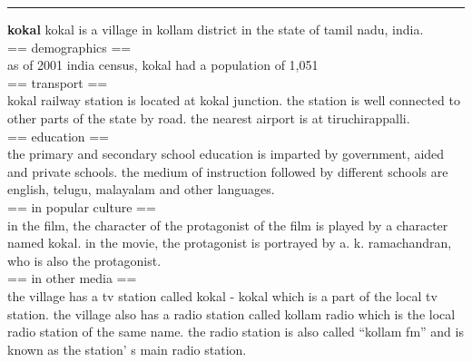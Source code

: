 \documentclass[11pt,a4paper]{article}
\begin{document}
\begin{figure*}[t]
  \small
  \rule{\linewidth}{1pt}
    \noindent \textbf{kokal}  kokal is a village in kollam district in the state of tamil nadu, india.  \\
    == demographics == \\ as of 2001 india census, kokal had a population of 1,051 \\
    == transport == \\ kokal railway station is located at kokal junction. the station is well connected to other parts of the state by road. the nearest airport is at tiruchirappalli.\\
    == education == \\ the primary and secondary school education is imparted by government, aided and private schools. the medium of instruction followed by different schools are english, telugu, malayalam and other languages. \\
    == in popular culture == \\ in the film, the character of the protagonist of the film is played by a character named kokal. in the movie, the protagonist is portrayed by a. k. ramachandran, who is also the protagonist. \\
    == in other media == \\ the village has a tv station called kokal - kokal which is a part of the local tv station. the village also has a radio station called kollam radio which is the local radio station of the same name. the radio station is also called ``kollam fm'' and is known as the station' s main radio station. \\
    

\end{figure*}
\end{document}
